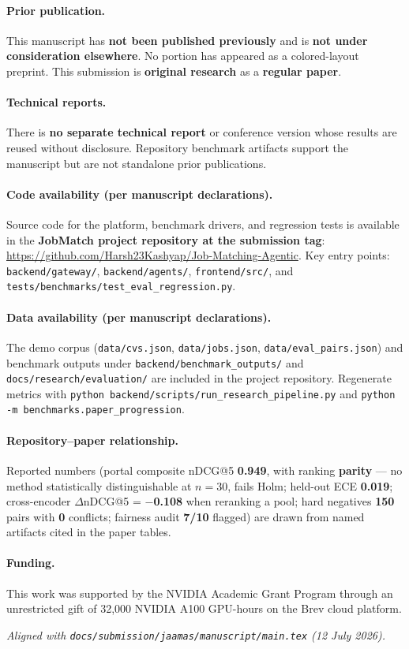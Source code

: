 \documentclass[11pt,a4paper]{article}
\begin{document}
\paragraph{Prior publication.}
This manuscript has \textbf{not been published previously} and is \textbf{not under consideration elsewhere}. No portion has appeared as a colored-layout preprint. This submission is \textbf{original research} as a \textbf{regular paper}.

\paragraph{Technical reports.}
There is \textbf{no separate technical report} or conference version whose results are reused without disclosure. Repository benchmark artifacts support the manuscript but are not standalone prior publications.

\paragraph{Code availability (per manuscript declarations).}
Source code for the platform, benchmark drivers, and regression tests is available in the \textbf{JobMatch project repository at the submission tag}: \url{https://github.com/Harsh23Kashyap/Job-Matching-Agentic}. Key entry points: \texttt{backend/gateway/}, \texttt{backend/agents/}, \texttt{frontend/src/}, and \texttt{tests/benchmarks/test\_eval\_regression.py}.

\paragraph{Data availability (per manuscript declarations).}
The demo corpus (\texttt{data/cvs.json}, \texttt{data/jobs.json}, \texttt{data/eval\_pairs.json}) and benchmark outputs under \texttt{backend/benchmark\_outputs/} and \texttt{docs/research/evaluation/} are included in the project repository. Regenerate metrics with \texttt{python backend/scripts/run\_research\_pipeline.py} and \texttt{python -m benchmarks.paper\_progression}.

\paragraph{Repository--paper relationship.}
Reported numbers (portal composite nDCG@5 \textbf{0.949}, with ranking \textbf{parity} --- no method statistically distinguishable at $n{=}30$, fails Holm; held-out ECE \textbf{0.019}; cross-encoder $\Delta$nDCG@5 = \textbf{$-$0.108} when reranking a pool; hard negatives \textbf{150} pairs with \textbf{0} conflicts; fairness audit \textbf{7/10} flagged) are drawn from named artifacts cited in the paper tables.

\paragraph{Funding.}
This work was supported by the NVIDIA Academic Grant Program through an unrestricted gift of 32,000 NVIDIA A100 GPU-hours on the Brev cloud platform.

\vspace{0.5em}
\noindent\small\textit{Aligned with \texttt{docs/submission/jaamas/manuscript/main.tex} (12 July 2026).}
\end{document}
